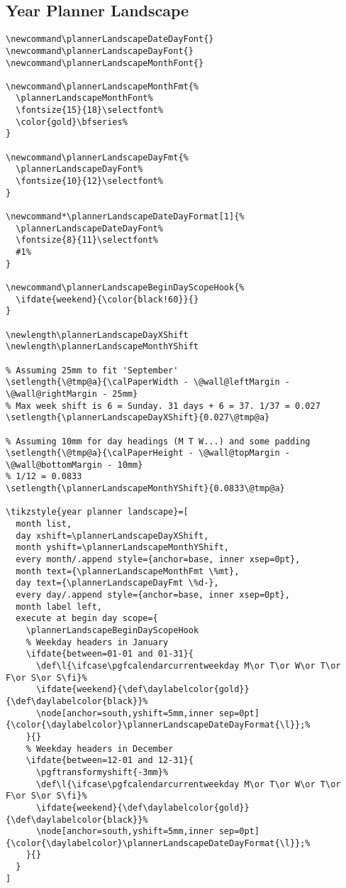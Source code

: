 \documentclass[11pt,oneside]{memoir-article}
\begin{document}
\subsection{Year Planner Landscape}
\label{sec:orgf67a4ae}

\begin{verbatim}
\newcommand\plannerLandscapeDateDayFont{}
\newcommand\plannerLandscapeDayFont{}
\newcommand\plannerLandscapeMonthFont{}

\newcommand\plannerLandscapeMonthFmt{%
  \plannerLandscapeMonthFont%
  \fontsize{15}{18}\selectfont%
  \color{gold}\bfseries%
}

\newcommand\plannerLandscapeDayFmt{%
  \plannerLandscapeDayFont%
  \fontsize{10}{12}\selectfont%
}

\newcommand*\plannerLandscapeDateDayFormat[1]{%
  \plannerLandscapeDateDayFont%
  \fontsize{8}{11}\selectfont%
  #1%
}

\newcommand\plannerLandscapeBeginDayScopeHook{%
  \ifdate{weekend}{\color{black!60}}{}
}

\newlength\plannerLandscapeDayXShift
\newlength\plannerLandscapeMonthYShift

% Assuming 25mm to fit 'September'
\setlength{\@tmp@a}{\calPaperWidth - \@wall@leftMargin - \@wall@rightMargin - 25mm}
% Max week shift is 6 = Sunday. 31 days + 6 = 37. 1/37 = 0.027
\setlength{\plannerLandscapeDayXShift}{0.027\@tmp@a}

% Assuming 10mm for day headings (M T W...) and some padding
\setlength{\@tmp@a}{\calPaperHeight - \@wall@topMargin - \@wall@bottomMargin - 10mm}
% 1/12 = 0.0833
\setlength{\plannerLandscapeMonthYShift}{0.0833\@tmp@a}

\tikzstyle{year planner landscape}=[
  month list,
  day xshift=\plannerLandscapeDayXShift,
  month yshift=\plannerLandscapeMonthYShift,
  every month/.append style={anchor=base, inner xsep=0pt},
  month text={\plannerLandscapeMonthFmt \%mt},
  day text={\plannerLandscapeDayFmt \%d-},
  every day/.append style={anchor=base, inner xsep=0pt},
  month label left,
  execute at begin day scope={
    \plannerLandscapeBeginDayScopeHook
    % Weekday headers in January
    \ifdate{between=01-01 and 01-31}{
      \def\l{\ifcase\pgfcalendarcurrentweekday M\or T\or W\or T\or F\or S\or S\fi}%
      \ifdate{weekend}{\def\daylabelcolor{gold}}{\def\daylabelcolor{black}}%
      \node[anchor=south,yshift=5mm,inner sep=0pt]{\color{\daylabelcolor}\plannerLandscapeDateDayFormat{\l}};%
    }{}
    % Weekday headers in December
    \ifdate{between=12-01 and 12-31}{
      \pgftransformyshift{-3mm}%
      \def\l{\ifcase\pgfcalendarcurrentweekday M\or T\or W\or T\or F\or S\or S\fi}%
      \ifdate{weekend}{\def\daylabelcolor{gold}}{\def\daylabelcolor{black}}%
      \node[anchor=south,yshift=5mm,inner sep=0pt]{\color{\daylabelcolor}\plannerLandscapeDateDayFormat{\l}};%
    }{}
  }
]
\end{verbatim}
\end{document}
